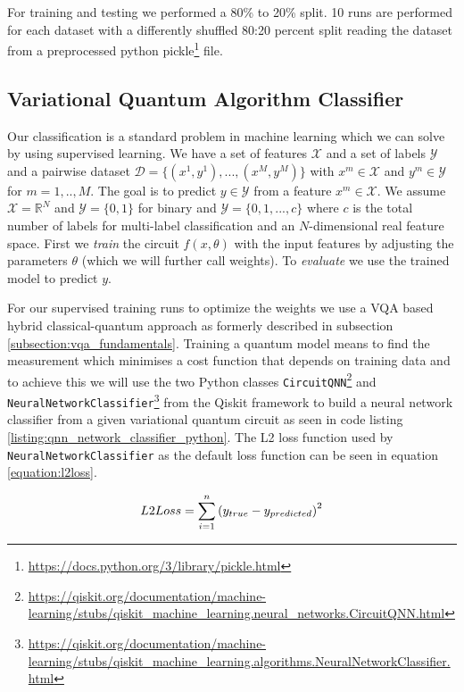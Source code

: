 For training and testing we performed a 80\% to 20\% split. 10 runs are performed for each dataset with a differently shuffled 80:20 percent split reading the dataset from a preprocessed python pickle\footnote{\url{https://docs.python.org/3/library/pickle.html}} file.

\clearpage

\subsection{Variational Quantum Algorithm Classifier} 
Our classification is a standard problem in machine learning which we can solve by using supervised learning. We have a set of features $\mathcal{X}$ and a set of labels $\mathcal{Y}$ and a pairwise dataset $\mathcal{D} = \{(x^1,y^1),...,(x^M,y^M)\}$ with $x^m \in \mathcal{X}$ and $y^m \in \mathcal{Y}$ for $m= 1,..,M$. The goal is to predict $y \in \mathcal{Y}$ from a feature $x^m \in \mathcal{X}$. We assume $\mathcal{X} = \mathbb{R}^N$ and $\mathcal{Y} = \{0,1\}$ for binary and $\mathcal{Y} = \{0,1,...,c\}$ where $c$ is the total number of labels for multi-label classification and an $N$-dimensional real feature space. First we \textit{train} the circuit $f(x,\theta)$ with the input features by adjusting the parameters $\theta$ (which we will further call weights). To \textit{evaluate} we use the trained model to predict $y$.

For our supervised training runs to optimize the weights we use a VQA based hybrid classical-quantum approach as formerly described in subsection \ref{subsection:vqa_fundamentals}. Training a quantum model means to find the measurement which minimises a cost function that depends on training data and to achieve this we will use the two Python classes \texttt{CircuitQNN}\footnote{\url{https://qiskit.org/documentation/machine-learning/stubs/qiskit_machine_learning.neural_networks.CircuitQNN.html}} and \texttt{NeuralNetworkClassifier}\footnote{\url{https://qiskit.org/documentation/machine-learning/stubs/qiskit_machine_learning.algorithms.NeuralNetworkClassifier.html}} from the Qiskit framework\cite{Qiskit} to build a neural network classifier from a given variational quantum circuit as seen in code listing \ref{listing:qnn_network_classifier_python}. The  L2 loss function used by \texttt{NeuralNetworkClassifier} as the default loss function can be seen in equation \ref{equation:l2loss}.

\begin{equation}
    \centering
        L2Loss = \sum _{i=1}^n\left(y_{true}-y_{predicted}\right)^2
    \label{equation:l2loss}
\end{equation}

